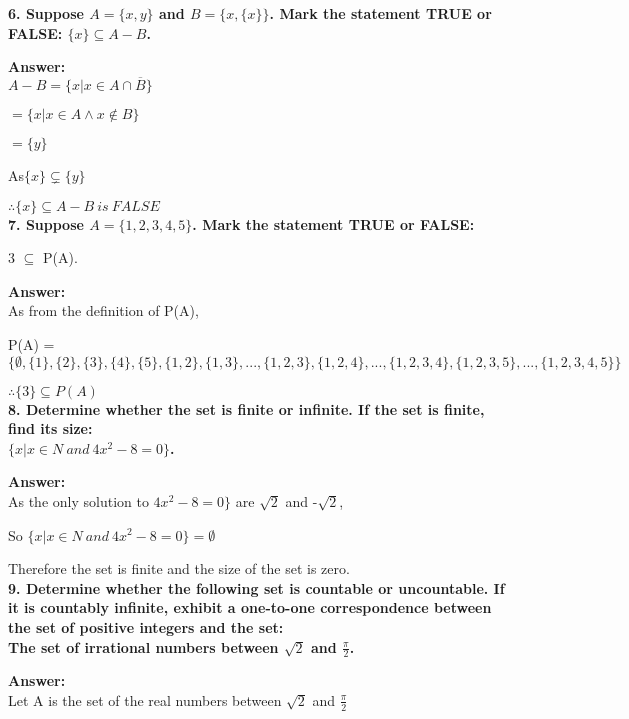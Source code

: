 \documentclass{article}
\begin{document}
\begin{large}
\textbf{6. Suppose $A=\{x,y\}$ and $B=\{x,\{x\}\}$. Mark the statement TRUE or FALSE: $\{x\}\subseteq A-B$.}

\textbf{Answer:} \\

$A-B = \{x|x \in A \cap \overline B\}$

    $= \{x|x \in A \land x \notin B\}$
    
   $ = \{y\}$

As$ \{x\} \subsetneq \{y\}$

$\therefore \{x\} \subseteq A-B\ is\ FALSE$\\


\textbf{7. Suppose $A=\{1,2,3,4,5\}$. Mark the statement TRUE or FALSE:}

{{3}} $\subseteq$ P(A).

\textbf{Answer:} \\

As from the definition of P(A), 
   
P(A) = $\{\emptyset, \{1\}, \{2\}, \{3\}, \{4\}, \{5\}, \{1,2\}, \{1,3\}, ..., \{1,2,3\}, \{1,2,4\}, ..., \{1,2,3,4\}, \{1,2,3,5\}, ...,\{1,2,3,4,5\}\}$

$\therefore {\{3\}} \subseteq P(A)$\\


\textbf{8. Determine whether the set is finite or infinite. If the set is finite, find its size:\\
\indent$\{x|x\in N\ and\ 4{x^{2}}-8=0\}$.}

\textbf{Answer:} \\
                                            
As the only solution to $4{x^{2}}-8=0\}$ are $\sqrt 2$ and -$\sqrt 2$, 

                            
So $\{x|x\in N\ and\ 4{x^{2}}-8=0\} = \emptyset $

Therefore the set is finite and the size of the set is zero.\\


\textbf{9. Determine whether the following set is countable or uncountable. If it is countably infinite, exhibit a one-to-one correspondence between the set of positive integers and the set:\\
The set of irrational numbers between $\sqrt{2}$ and $\frac{\pi}{2}$.}

\textbf{Answer:} \\

Let A is the set of the real numbers between $\sqrt{2}$ and $\frac{\pi}{2}$


\end{large}
\end{document}
